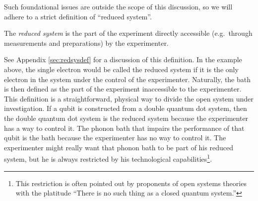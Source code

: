 Such foundational issues are outside the scope of this discussion, so we will adhere to a strict definition of ``reduced system''.  
\begin{definition}
The {\em reduced system} is the part of the experiment directly accessible (e.g.\ through measurements and preparations) by the experimenter.  
\end{definition}
See Appendix \ref{sec:redsysdef} for a discussion of this definition.  In the example above, the single electron would be called the reduced system if it is the only electron in the system under the control of the experimenter.  Naturally, the bath is then defined as the part of the experiment inaccessible to the experimenter.  This definition is a straightforward, physical way to divide the open system under investigation.  If a qubit is constructed from a double quantum dot system, then the double quantum dot system is the reduced system because the experimenter has a way to control it.  The phonon bath that impairs the performance of that qubit is the bath because the experimenter has no way to control it.  The experimenter might really want that phonon bath to be part of his reduced system, but he is always restricted by his technological capabilities\footnote{This restriction is often pointed out by proponents of open systems theories with the platitude ``There is no such thing as a closed quantum system.''}.

